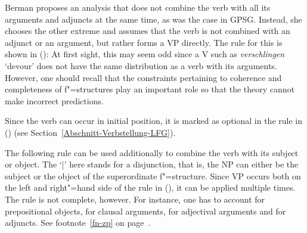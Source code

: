 \ea
\label{le-verschlingen}
\z

\noindent
Berman proposes an analysis that does not combine the verb with all its arguments and adjuncts at
the same time, as was the case in GPSG\indexgpsg. Instead, she chooses the other extreme and assumes
that the verb is not combined with an adjunct or an argument, but rather forms a VP directly. The rule for this is shown in ():
\ea
\label{LFG-v-vp}
\z
At first sight, this may seem odd since a V such as \emph{verschlingen} `devour' does not have the same distribution as a verb with its arguments. However, one should recall that the
constraints pertaining to coherence and completeness of f"=structures play an important role so that the theory cannot make incorrect predictions.

Since the verb can occur in initial position, it is marked as optional in the rule in () (see Section~\ref{Abschnitt-Verbstellung-LFG}).

The following rule can be used additionally to combine the verb with its subject or object.
\ea
\label{lfg-vp-regel}
\z
The `|'\is{$\vert$} here stands for a disjunction, that is, the NP can either be the subject or the object of the superordinate f"=structure. Since VP occurs both on the left
and right"=hand side of the rule in (), it can be applied multiple times.
The rule is not complete, however. For instance, one has to account for prepositional objects, for clausal
arguments, for adjectival arguments and for adjuncts. See footnote~\ref{fn-zp} on page~\pageref{fn-zp}.


